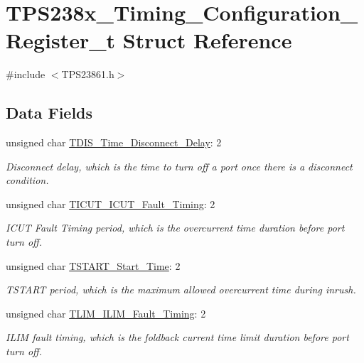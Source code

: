 \hypertarget{struct_t_p_s238x___timing___configuration___register__t}{\section{T\-P\-S238x\-\_\-\-Timing\-\_\-\-Configuration\-\_\-\-Register\-\_\-t Struct Reference}
\label{struct_t_p_s238x___timing___configuration___register__t}
}


{\ttfamily \#include $<$T\-P\-S23861.\-h$>$}

\subsection*{Data Fields}
\begin{DoxyCompactItemize}
\item 
unsigned char \hyperlink{struct_t_p_s238x___timing___configuration___register__t_a125cc8ba8c1d5ed16d952646256c9120}{T\-D\-I\-S\-\_\-\-Time\-\_\-\-Disconnect\-\_\-\-Delay}\-: 2
\begin{DoxyCompactList}\small\item\em Disconnect delay, which is the time to turn off a port once there is a disconnect condition. \end{DoxyCompactList}\item 
unsigned char \hyperlink{struct_t_p_s238x___timing___configuration___register__t_a6adbf61b88c9a0c9b6a1d108afa55e93}{T\-I\-C\-U\-T\-\_\-\-I\-C\-U\-T\-\_\-\-Fault\-\_\-\-Timing}\-: 2
\begin{DoxyCompactList}\small\item\em I\-C\-U\-T Fault Timing period, which is the overcurrent time duration before port turn off. \end{DoxyCompactList}\item 
unsigned char \hyperlink{struct_t_p_s238x___timing___configuration___register__t_aef10bd8d63cf53434ef90a8d135e9760}{T\-S\-T\-A\-R\-T\-\_\-\-Start\-\_\-\-Time}\-: 2
\begin{DoxyCompactList}\small\item\em T\-S\-T\-A\-R\-T period, which is the maximum allowed overcurrent time during inrush. \end{DoxyCompactList}\item 
unsigned char \hyperlink{struct_t_p_s238x___timing___configuration___register__t_a2635690243edb947f167f83c38c42e13}{T\-L\-I\-M\-\_\-\-I\-L\-I\-M\-\_\-\-Fault\-\_\-\-Timing}\-: 2
\begin{DoxyCompactList}\small\item\em I\-L\-I\-M fault timing, which is the foldback current time limit duration before port turn off. \end{DoxyCompactList}\end{DoxyCompactItemize}


